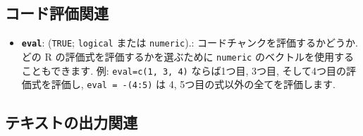 \documentclass[
  xelatex,ja=standard,jafont=noto]{bxjsreport}
\providecommand{\tightlist}{%
  \setlength{\itemsep}{0pt}\setlength{\parskip}{0pt}}
\begin{document}
\hypertarget{evaluate}{%
\subsection{コード評価関連}\label{evaluate}}

\begin{itemize}
\tightlist
\item
  \textbf{\texttt{eval}}: (\texttt{TRUE}; \texttt{logical} または
  \texttt{numeric}).: コードチャンクを評価するかどうか. どの R
  の評価式を評価するかを選ぶために \texttt{numeric}
  のベクトルを使用することもできます. 例: \texttt{eval=c(1,\ 3,\ 4)}
  ならば1つ目, 3つ目, そして4つ目の評価式を評価し,
  \texttt{eval\ =\ -(4:5)} は 4, 5つ目の式以外の全てを評価します.
\end{itemize}

\hypertarget{text-output}{%
\subsection{テキストの出力関連}\label{text-output}}
\end{document}
